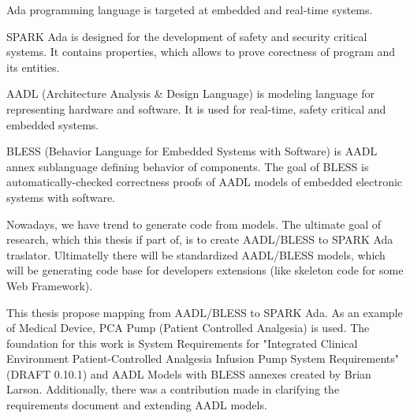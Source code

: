
\pagestyle{empty}
\setlength{\baselineskip}{0.8cm}




Ada programming language is targeted at embedded and real-time systems.

SPARK Ada is designed for the development of safety and security critical systems. It contains properties, which allows to prove corectness of program and its entities.

AADL (Architecture Analysis \& Design Language) is modeling language for representing hardware and software. It is used for real-time, safety critical and embedded systems.

BLESS (Behavior Language for Embedded Systems with Software) is AADL annex sublanguage defining behavior of components. The goal of BLESS is automatically-checked correctness proofs of AADL models of embedded electronic systems with software.

Nowadays, we have trend to generate code from models. The ultimate goal of research, which this thesis if part of, is to create AADL/BLESS to SPARK Ada traslator. Ultimatelly there will be standardized AADL/BLESS models, which will be generating code base for developers extensions (like skeleton code for some Web Framework).

This thesis propose mapping from AADL/BLESS to SPARK Ada. As an example of Medical Device, PCA Pump (Patient Controlled Analgesia) is used. The foundation for this work is System Requirements for "Integrated Clinical Environment Patient-Controlled Analgesia Infusion Pump System Requirements" (DRAFT 0.10.1) \cite{PcaReq} and AADL Models with BLESS annexes created by Brian Larson. Additionally, there was a contribution made in clarifying the requirements document and extending AADL models.
